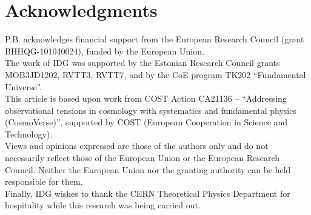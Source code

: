 \documentclass[a4paper,11pt]{article}
\begin{document}
\section*{Acknowledgments}
P.B. acknowledges financial support from the European Research Council (grant BHHQG-101040024), funded by the European Union.
\\
The work of IDG was supported by the Estonian Research Council grants MOB3JD1202, RVTT3,  RVTT7, and by the CoE program TK202 ``Fundamental Universe''. \\
This article is based upon work from COST Action CA21136 – “Addressing observational tensions in cosmology with systematics and fundamental physics (CosmoVerse)”, supported by COST (European Cooperation in Science and Technology).\\
Views and opinions expressed are those of the authors only and do not necessarily reflect those of the European Union or the European Research Council. Neither the European Union nor the granting authority can be held responsible for them.\\
Finally, IDG wishes to thank the CERN Theoretical Physics Department for hospitality while this research was being carried out.

\appendix

\end{document}
